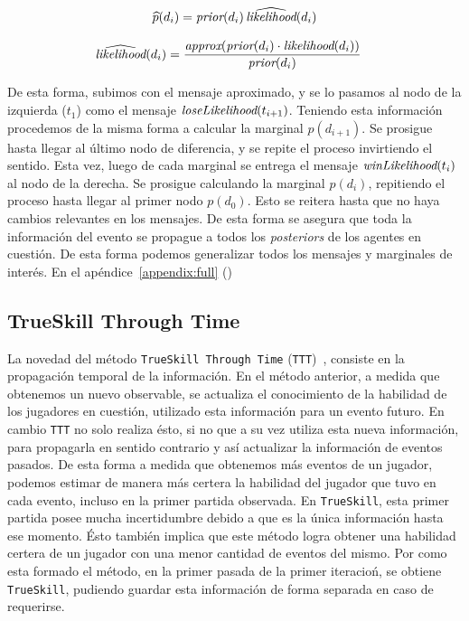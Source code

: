 \documentclass[11pt,twoside,spanish]{report} %
\begin{document}
\begin{equation}
\widehat{p}(d_i) = \emph{prior}(d_i) \, \widehat{\emph{likelihood}}(d_i)
\end{equation}

\begin{equation}
\begin{split}
\widehat{\emph{likelihood}}(d_i) &= \frac{\emph{approx}(\emph{prior}(d_i) \cdot \emph{likelihood}(d_i))}{ \emph{prior}(d_i)}
\end{split}
\end{equation}


De esta forma, subimos con el mensaje aproximado, y se lo pasamos al nodo de la izquierda ($t_1$) como el mensaje $\emph{loseLikelihood}(t_{i+1})$.
Teniendo esta informaci\'on procedemos de la misma forma a calcular la marginal $p(d_{i+1})$.
Se prosigue hasta llegar al \'ultimo nodo de diferencia, y se repite el proceso invirtiendo el sentido.
Esta vez, luego de cada marginal se entrega el mensaje $\emph{winLikelihood}(t_{i})$ al nodo de la derecha.
Se prosigue calculando la marginal $p(d_{i})$, repitiendo el proceso hasta llegar al primer nodo $p(d_{0})$.
Esto se reitera hasta que no haya cambios relevantes en los mensajes.
De esta forma se asegura que toda la informaci\'on del evento se propague a todos los \textit{posteriors} de los agentes en cuesti\'on.
De esta forma podemos generalizar todos los mensajes y marginales de inter\'es.
En el ap\'endice~\ref{appendix:full} ()





\subsection{TrueSkill Through Time}\label{Sec:TTT}


La novedad del m\'etodo  \texttt{TrueSkill Through Time} (\texttt{TTT})~\cite{Dangauthier2007}, consiste en la propagaci\'on temporal de la informaci\'on.
En el m\'etodo anterior, a medida que obtenemos un nuevo observable, se actualiza el conocimiento de la habilidad de los jugadores en cuesti\'on, utilizado esta informaci\'on para un evento futuro.
En cambio \texttt{TTT} no solo realiza \'esto, si no que a su vez utiliza esta nueva informaci\'on, para propagarla en sentido contrario y as\'i actualizar la informaci\'on de eventos pasados.
De esta forma a medida que obtenemos m\'as eventos de un jugador, podemos estimar de manera m\'as certera la habilidad del jugador  que tuvo en cada evento, incluso en la primer partida observada.
En \texttt{TrueSkill}, esta primer partida posee mucha incertidumbre debido a que es la \'unica informaci\'on hasta ese momento.
\'Esto tambi\'en implica que este m\'etodo logra obtener una habilidad certera de un jugador con una menor cantidad de eventos del mismo.
Por como esta formado el m\'etodo, en la primer pasada de la primer iteracio\'n, se obtiene \texttt{TrueSkill}, pudiendo guardar esta informaci\'on de forma separada en caso de requerirse.
\end{document}
